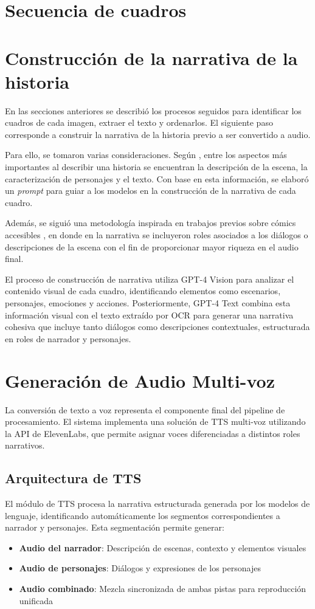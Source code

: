 \documentclass[conference]{IEEEtran}
\begin{document}
\section{Secuencia de cuadros}

\section{Construcción de la narrativa de la historia}
En las secciones anteriores se describió los procesos seguidos para identificar los cuadros de cada imagen, extraer el texto y ordenarlos. El siguiente paso corresponde a construir la narrativa de la historia previo a ser convertido a audio.

Para ello, se tomaron varias consideraciones. Según \cite{sharma2021accesscomics}, entre los aspectos más importantes al describir una historia se encuentran la descripción de la escena, la caracterización de personajes y el texto. Con base en esta información, se elaboró un \emph{prompt} para guiar a los modelos en la construcción de la narrativa de cada cuadro.

Además, se siguió una metodología inspirada en trabajos previos sobre cómics accesibles \cite{sharma2021accesscomics}, en donde en la narrativa se incluyeron roles asociados a los diálogos o descripciones de la escena con el fin de proporcionar mayor riqueza en el audio final.

El proceso de construcción de narrativa utiliza GPT-4 Vision para analizar el contenido visual de cada cuadro, identificando elementos como escenarios, personajes, emociones y acciones. Posteriormente, GPT-4 Text combina esta información visual con el texto extraído por OCR para generar una narrativa cohesiva que incluye tanto diálogos como descripciones contextuales, estructurada en roles de narrador y personajes.

\section{Generación de Audio Multi-voz}
La conversión de texto a voz representa el componente final del pipeline de procesamiento. El sistema implementa una solución de TTS multi-voz utilizando la API de ElevenLabs, que permite asignar voces diferenciadas a distintos roles narrativos.

\subsection{Arquitectura de TTS}
El módulo de TTS procesa la narrativa estructurada generada por los modelos de lenguaje, identificando automáticamente los segmentos correspondientes a narrador y personajes. Esta segmentación permite generar:
\begin{itemize}
\item \textbf{Audio del narrador}: Descripción de escenas, contexto y elementos visuales
\item \textbf{Audio de personajes}: Diálogos y expresiones de los personajes
\item \textbf{Audio combinado}: Mezcla sincronizada de ambas pistas para reproducción unificada
\end{itemize}
\end{document}
